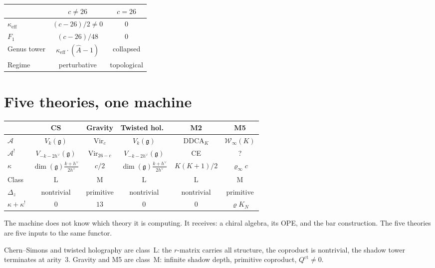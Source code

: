 \documentclass[11pt]{article}
\newcommand{\cA}{\mathcal{A}}
\newcommand{\cW}{\mathcal{W}}
\newcommand{\fg}{\mathfrak{g}}
\begin{document}
\begin{center}
\small
\renewcommand{\arraystretch}{1.15}
\begin{tabular}{@{}lcc@{}}
& $c \neq 26$ & $c = 26$ \\
\hline
$\kappa_{\mathrm{eff}}$ & $(c-26)/2 \neq 0$ & $0$ \\[3pt]
$F_1$ & $(c-26)/48$ & $0$ \\[3pt]
Genus tower & $\kappa_{\mathrm{eff}}\cdot(\hat{A}-1)$ & collapsed \\[3pt]
Regime & perturbative & topological
\end{tabular}
\end{center}


\section{Five theories, one machine}
\label{sec:five-theories}

\begin{center}
\small
\renewcommand{\arraystretch}{1.15}
\begin{tabular}{@{}lccccc@{}}
& CS & Gravity & Twisted hol.\ & M2 & M5 \\
\hline
$\cA$ & $V_k(\fg)$ & $\mathrm{Vir}_c$
  & $V_k(\fg)$ & DDCA$_K$ & $\cW_\infty(K)$ \\[3pt]
$\cA^!$ & $V_{-k-2h^\vee}(\fg)$ & $\mathrm{Vir}_{26-c}$
  & $V_{-k-2h^\vee}(\fg)$ & CE & ? \\[3pt]
$\kappa$ & $\dim(\fg)\frac{k+h^\vee}{2h^\vee}$
  & $c/2$ & $\dim(\fg)\frac{k+h^\vee}{2h^\vee}$
  & $K(K{+}1)/2$ & $\varrho_\infty c$ \\[3pt]
Class & L & M & L & L & M \\[3pt]
$\Delta_z$ & nontrivial & primitive & nontrivial
  & nontrivial & primitive \\[3pt]
$\kappa + \kappa^!$ & $0$ & $13$ & $0$ & $0$
  & $\varrho K_N$
\end{tabular}
\end{center}

\medskip

The machine does not know which theory it is computing.  It
receives: a chiral algebra, its OPE, and the bar construction.
The five theories are five inputs to the same functor.

Chern--Simons and twisted holography are class~L: the $r$-matrix
carries all structure, the coproduct is nontrivial, the shadow
tower terminates at arity~$3$.  Gravity and M5 are class~M:
infinite shadow depth, primitive coproduct,
$Q^{\mathrm{ct}} \neq 0$.
\end{document}
